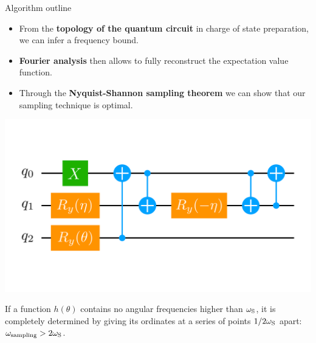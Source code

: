 \begin{frame}[allowframebreaks]{Algorithm outline}
\break

  \begin{multicols}{2}

    \begin{itemize}
      \item From the \textbf{topology of the quantum circuit} in charge of state preparation, we can infer a frequency bound.
      \item \textbf{Fourier analysis} then allows to fully reconstruct the expectation value function.
      \item Through the \textbf{Nyquist-Shannon sampling theorem} we can show that our sampling technique is optimal.
    \end{itemize}

    \columnbreak

    \begin{center}
      \includegraphics[width=.40\paperwidth]{Figures/chapter05/deuteron-quantum-circuits-2}
    \end{center}

  \end{multicols}

  \vspace{-1em}
  \begin{theorem}
    If a function $h(\theta)$ contains no angular frequencies higher than $\omega_{\textnormal{S}}$, it is completely determined by giving its ordinates at a series of points $1/2\omega_{\textnormal{S}}$ apart: $\omega_{\textnormal{sampling}} > 2\omega_{\textnormal{S}}$.
  \end{theorem}

\end{frame}


